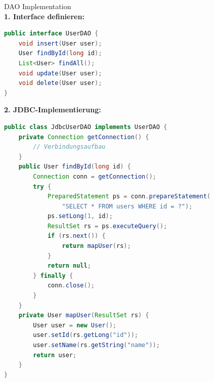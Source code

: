 \begin{example2}{DAO Implementation}\\
\textbf{1. Interface definieren:}
\begin{lstlisting}[language=Java, style=basesmol]
public interface UserDAO {
    void insert(User user);
    User findById(long id);
    List<User> findAll();
    void update(User user);
    void delete(User user);
}
\end{lstlisting}

\textbf{2. JDBC-Implementierung:}
\begin{lstlisting}[language=Java, style=basesmol]
public class JdbcUserDAO implements UserDAO {
    private Connection getConnection() {
        // Verbindungsaufbau
    }
    public User findById(long id) {
        Connection conn = getConnection();
        try {
            PreparedStatement ps = conn.prepareStatement(
                "SELECT * FROM users WHERE id = ?");
            ps.setLong(1, id);
            ResultSet rs = ps.executeQuery();
            if (rs.next()) {
                return mapUser(rs);
            }
            return null;
        } finally {
            conn.close();
        }
    }
    private User mapUser(ResultSet rs) {
        User user = new User();
        user.setId(rs.getLong("id"));
        user.setName(rs.getString("name"));
        return user;
    }
}
\end{lstlisting}
\end{example2}

